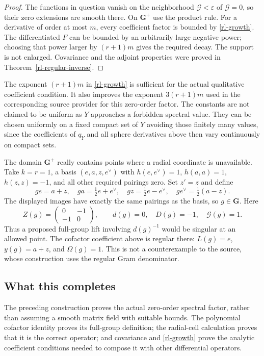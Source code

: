 \begin{proof}
The functions in question vanish on the neighborhood
$\mathcal G<\varepsilon$ of $\mathcal G=0$,
so their zero extensions are smooth there.
On $\mathbf G^+$ use the product rule.
For a derivative of order at most $m$, every
coefficient factor is bounded by
\eqref{rl-growth}.  The differentiated $F$ can be
bounded by an arbitrarily large negative power;
choosing that power larger by $(r+1)m$ gives the
required decay.  The support is not enlarged.
Covariance and the adjoint properties were proved
in Theorem~\ref{rl-regular-inverse}.
\end{proof}

The exponent $(r+1)m$ in \eqref{rl-growth} is sufficient
for the actual qualitative coefficient condition.
It also improves the exponent $3(r+1)m$ used in
the corresponding source provider for this zero-order
factor.  The constants are not claimed to be uniform
as $Y$ approaches a forbidden spectral value.
They can be chosen uniformly on a fixed compact set
of $Y$ avoiding those finitely many values, since
the coefficients of $q_Y$ and all sphere derivatives
above then vary continuously on compact sets.

\begin{example}\label{rl-vanishing-middle-minor}
The domain $\mathbf G^+$ really contains points
where a radial coordinate is unavailable.
Take $k=r=1$, a basis $(e,a,z,e^\vee)$ with
$h(e,e^\vee)=1$, $h(a,a)=1$, $h(z,z)=-1$,
and all other required pairings zero.
Set $z'=z$ and define
\[
 ge=a+z,\quad
 ga=\tfrac12e+e^\vee,\quad
 gz=\tfrac12e-e^\vee,\quad
 ge^\vee=\tfrac12(a-z).
\]
The displayed images have exactly the same pairings
as the basis, so $g\in\mathbf G$.
Here
\[
             Z(g)=\begin{pmatrix}0&-1\\-1&0\end{pmatrix},
       \qquad d(g)=0,\quad D(g)=-1,\quad\mathcal G(g)=1.
\]
Thus a proposed full-group lift involving $d(g)^{-1}$
would be singular at an allowed point.
The cofactor coefficient above is regular there:
$L(g)=e$, $y(g)=a+z$, and $\Omega(g)=1$.
This is not a counterexample to the source, whose
construction uses the regular Gram denominator.
\end{example}

\subsection{What this completes}

The preceding construction proves the actual
zero-order spectral factor, rather than assuming
a smooth matrix field with suitable bounds.
The polynomial cofactor identity proves its full-group
definition; the radial-cell calculation proves that
it is the correct operator; and covariance and
\eqref{rl-growth} prove the analytic coefficient
conditions needed to compose it with other
differential operators.

